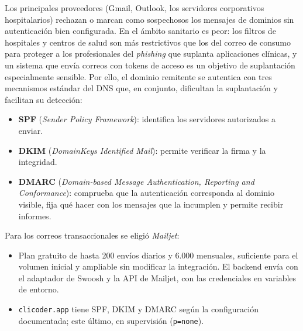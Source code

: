 Los principales proveedores (Gmail, Outlook, los servidores corporativos hospitalarios) rechazan o marcan como sospechosos los mensajes de dominios sin autenticación bien configurada. En el ámbito sanitario es peor: los filtros de hospitales y centros de salud son más restrictivos que los del correo de consumo para proteger a los profesionales del \emph{phishing} que suplanta aplicaciones clínicas, y un sistema que envía correos con tokens de acceso es un objetivo de suplantación especialmente sensible. Por ello, el dominio remitente se autentica con tres mecanismos estándar del DNS que, en conjunto, dificultan la suplantación y facilitan su detección:

\begin{itemize}
 \item \textbf{SPF} (\emph{Sender Policy Framework}): identifica los servidores autorizados a enviar.
 \item \textbf{DKIM} (\emph{DomainKeys Identified Mail}): permite verificar la firma y la integridad.
 \item \textbf{DMARC} (\emph{Domain-based Message Authentication, Reporting and Conformance}): comprueba que la autenticación corresponda al dominio visible, fija qué hacer con los mensajes que la incumplen y permite recibir informes.
\end{itemize}

Para los correos transaccionales se eligió \textit{Mailjet}:

\begin{itemize}
 \item Plan gratuito de hasta 200 envíos diarios y 6.000 mensuales, suficiente para el volumen inicial y ampliable sin modificar la integración. El backend envía con el adaptador de Swoosh y la API de Mailjet, con las credenciales en variables de entorno.
 \item \texttt{clicoder.app} tiene SPF, DKIM y DMARC según la configuración documentada; este último, en supervisión (\texttt{p=none}).
\end{itemize}


